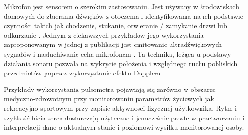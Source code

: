 Mikrofon jest sensorem o szerokim zastosowaniu. Jest używany w środowiskach domowych do zbierania dźwięków z otoczenia i identyfikowania na ich podstawie czynności takich jak chodzenie, stukanie, otwieranie / zamykanie drzwi lub odkurzanie \cite{46_Indor_Audio_Rec}. Jednym z ciekawszych przykładów jego wykorzystania zaproponowanym w jednej z publikacji jest emitowanie ultradźwiękowych sygnałów i nasłuchiwanie echa mikrofonem \cite{22_HAR_Survey_Ultrasonic}. Ta technika, leżąca u podstawy działania sonaru pozwala na wykrycie położenia i względnego ruchu pobliskich przedmiotów poprzez wykorzystanie efektu Dopplera.

Przykłady wykorzystania pulsometra pojawiają się zarówno w obszarze medyczno-zdrowotnym \cite{62_The_Long_Review} przy monitorowaniu parametrów życiowych jak i rekreacyjno-sportowym \cite{51_Fixbit_tracker} przy zapisie aktywności fizycznej użytkownika. Rytm i szybkość bicia serca dostarczają użyteczne i jenocześnie proste w przetwarzaniu i interpretacji dane o aktualnym stanie i poziomowi wysiłku monitorowanej osoby.
